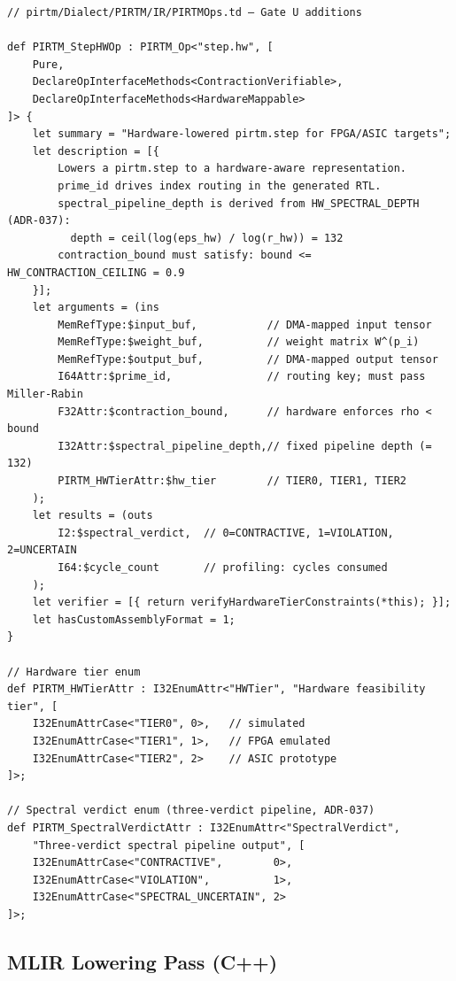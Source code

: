 \documentclass[12pt,letterpaper]{article}
\theoremstyle{plain}
\theoremstyle{definition}
\theoremstyle{remark}
\begin{document}
\begin{lstlisting}[style=tablegen, caption={\texttt{PIRTMOps.td} --- Gate U hardware op definition}, label=lst:tablegen]
// pirtm/Dialect/PIRTM/IR/PIRTMOps.td — Gate U additions

def PIRTM_StepHWOp : PIRTM_Op<"step.hw", [
    Pure,
    DeclareOpInterfaceMethods<ContractionVerifiable>,
    DeclareOpInterfaceMethods<HardwareMappable>
]> {
    let summary = "Hardware-lowered pirtm.step for FPGA/ASIC targets";
    let description = [{
        Lowers a pirtm.step to a hardware-aware representation.
        prime_id drives index routing in the generated RTL.
        spectral_pipeline_depth is derived from HW_SPECTRAL_DEPTH (ADR-037):
          depth = ceil(log(eps_hw) / log(r_hw)) = 132
        contraction_bound must satisfy: bound <= HW_CONTRACTION_CEILING = 0.9
    }];
    let arguments = (ins
        MemRefType:$input_buf,           // DMA-mapped input tensor
        MemRefType:$weight_buf,          // weight matrix W^(p_i)
        MemRefType:$output_buf,          // DMA-mapped output tensor
        I64Attr:$prime_id,               // routing key; must pass Miller-Rabin
        F32Attr:$contraction_bound,      // hardware enforces rho < bound
        I32Attr:$spectral_pipeline_depth,// fixed pipeline depth (= 132)
        PIRTM_HWTierAttr:$hw_tier        // TIER0, TIER1, TIER2
    );
    let results = (outs
        I2:$spectral_verdict,  // 0=CONTRACTIVE, 1=VIOLATION, 2=UNCERTAIN
        I64:$cycle_count       // profiling: cycles consumed
    );
    let verifier = [{ return verifyHardwareTierConstraints(*this); }];
    let hasCustomAssemblyFormat = 1;
}

// Hardware tier enum
def PIRTM_HWTierAttr : I32EnumAttr<"HWTier", "Hardware feasibility tier", [
    I32EnumAttrCase<"TIER0", 0>,   // simulated
    I32EnumAttrCase<"TIER1", 1>,   // FPGA emulated
    I32EnumAttrCase<"TIER2", 2>    // ASIC prototype
]>;

// Spectral verdict enum (three-verdict pipeline, ADR-037)
def PIRTM_SpectralVerdictAttr : I32EnumAttr<"SpectralVerdict",
    "Three-verdict spectral pipeline output", [
    I32EnumAttrCase<"CONTRACTIVE",        0>,
    I32EnumAttrCase<"VIOLATION",          1>,
    I32EnumAttrCase<"SPECTRAL_UNCERTAIN", 2>
]>;
\end{lstlisting}

\subsection{MLIR Lowering Pass (C++)}
\end{document}
